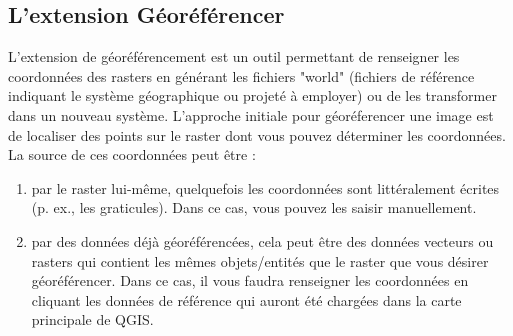 \subsection{L'extension Géoréférencer}


L'extension de géoréférencement est un outil permettant de renseigner les coordonnées des rasters en générant les fichiers "world" (fichiers de référence indiquant le système géographique ou projeté à employer) ou de les transformer dans un nouveau système. L'approche initiale pour géoréferencer une image est de localiser des points sur le raster dont vous pouvez déterminer les coordonnées. La source de ces coordonnées peut être :


\begin{enumerate}
\item par le raster lui-même, quelquefois les coordonnées sont littéralement écrites (p. ex., les graticules). Dans ce cas, vous pouvez les saisir manuellement.
\item par des données déjà géoréférencées, cela peut être des données vecteurs ou rasters qui contient les mêmes objets/entités que le raster que vous désirer géoréférencer. Dans ce cas, il vous faudra renseigner les coordonnées en cliquant les données de référence qui auront été chargées dans la carte principale de QGIS.
\end{enumerate}


